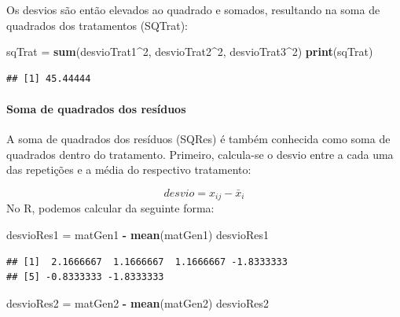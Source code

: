 \documentclass[
]{article}
\newenvironment{Shaded}{\begin{snugshade}}{\end{snugshade}}
\newcommand{\DecValTok}[1]{\textcolor[rgb]{0.00,0.00,0.81}{#1}}
\newcommand{\KeywordTok}[1]{\textcolor[rgb]{0.13,0.29,0.53}{\textbf{#1}}}
\newcommand{\NormalTok}[1]{#1}
\newcommand{\OperatorTok}[1]{\textcolor[rgb]{0.81,0.36,0.00}{\textbf{#1}}}
\newcommand{\StringTok}[1]{\textcolor[rgb]{0.31,0.60,0.02}{#1}}
\begin{document}
Os desvios são então elevados ao quadrado e somados, resultando na soma de quadrados dos tratamentos (SQTrat):

\begin{Shaded}
\begin{Highlighting}[]
\NormalTok{sqTrat =}\StringTok{ }\KeywordTok{sum}\NormalTok{(desvioTrat1}\OperatorTok{^}\DecValTok{2}\NormalTok{, desvioTrat2}\OperatorTok{^}\DecValTok{2}\NormalTok{, desvioTrat3}\OperatorTok{^}\DecValTok{2}\NormalTok{)}
\KeywordTok{print}\NormalTok{(sqTrat)}
\end{Highlighting}
\end{Shaded}

\begin{verbatim}
## [1] 45.44444
\end{verbatim}

\hypertarget{soma-de-quadrados-dos-resuxedduos}{%
\paragraph{Soma de quadrados dos resíduos}\label{soma-de-quadrados-dos-resuxedduos}}

A soma de quadrados dos resíduos (SQRes) é também conhecida como soma de quadrados dentro do tratamento. Primeiro, calcula-se o desvio entre a cada uma das repetições e a média do respectivo tratamento:

\[desvio = x_{ij} - \bar{x}_{i}\]
No R, podemos calcular da seguinte forma:

\begin{Shaded}
\begin{Highlighting}[]
\NormalTok{desvioRes1 =}\StringTok{ }\NormalTok{matGen1 }\OperatorTok{-}\StringTok{ }\KeywordTok{mean}\NormalTok{(matGen1)}
\NormalTok{desvioRes1}
\end{Highlighting}
\end{Shaded}

\begin{verbatim}
## [1]  2.1666667  1.1666667  1.1666667 -1.8333333
## [5] -0.8333333 -1.8333333
\end{verbatim}

\begin{Shaded}
\begin{Highlighting}[]
\NormalTok{desvioRes2 =}\StringTok{ }\NormalTok{matGen2 }\OperatorTok{-}\StringTok{ }\KeywordTok{mean}\NormalTok{(matGen2)}
\NormalTok{desvioRes2}
\end{Highlighting}
\end{Shaded}
\end{document}
